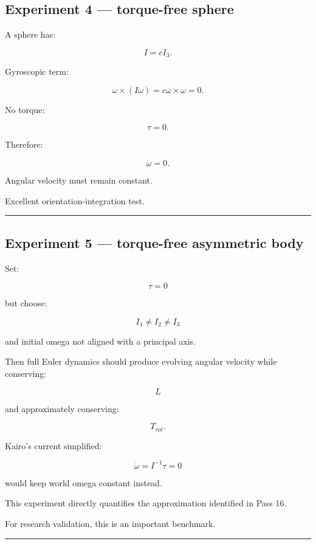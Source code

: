 \subsection{Experiment 4 --- torque-free sphere}\label{06-engine-ii-ch039-experiment-4-torque-free-sphere}

A sphere has:

\[
I=cI_3.
\]

Gyroscopic term:

\[
\omega\times(I\omega)
=
c\omega\times\omega
=
0.
\]

No torque:

\[
\tau=0.
\]

Therefore:

\[
\dot\omega=0.
\]

Angular velocity must remain constant.

Excellent orientation-integration test.

\begin{center}\rule{0.5\linewidth}{0.5pt}\end{center}

\subsection{Experiment 5 --- torque-free asymmetric body}\label{06-engine-ii-ch039-experiment-5-torque-free-asymmetric-body}

Set:

\[
\tau=0
\]

but choose:

\[
I_1\neq I_2\neq I_3
\]

and initial omega not aligned with a principal axis.

Then full Euler dynamics should produce evolving angular velocity while conserving:

\[
L
\]

and approximately conserving:

\[
T_{rot}.
\]

Kairo's current simplified:

\[
\dot\omega=I^{-1}\tau=0
\]

would keep world omega constant instead.

This experiment directly quantifies the approximation identified in Pass 16.

For research validation, this is an important benchmark.

\begin{center}\rule{0.5\linewidth}{0.5pt}\end{center}

